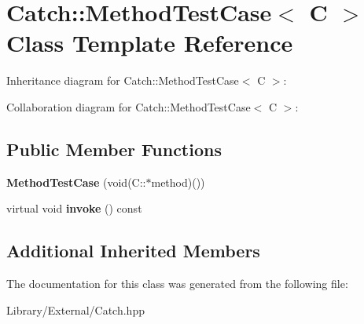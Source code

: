 \hypertarget{class_catch_1_1_method_test_case}{}\section{Catch\+:\+:Method\+Test\+Case$<$ C $>$ Class Template Reference}
\label{class_catch_1_1_method_test_case}


Inheritance diagram for Catch\+:\+:Method\+Test\+Case$<$ C $>$\+:


Collaboration diagram for Catch\+:\+:Method\+Test\+Case$<$ C $>$\+:
\subsection*{Public Member Functions}
\begin{DoxyCompactItemize}
\item 
\hypertarget{class_catch_1_1_method_test_case_a7b043b85dae371358255dd9dc6582e7b}{}{\bfseries Method\+Test\+Case} (void(C\+::$\ast$method)())\label{class_catch_1_1_method_test_case_a7b043b85dae371358255dd9dc6582e7b}

\item 
\hypertarget{class_catch_1_1_method_test_case_a39cc4b760dd71adc3f7550bc1e7eb697}{}virtual void {\bfseries invoke} () const \label{class_catch_1_1_method_test_case_a39cc4b760dd71adc3f7550bc1e7eb697}

\end{DoxyCompactItemize}
\subsection*{Additional Inherited Members}


The documentation for this class was generated from the following file\+:\begin{DoxyCompactItemize}
\item 
Library/\+External/Catch.\+hpp\end{DoxyCompactItemize}
